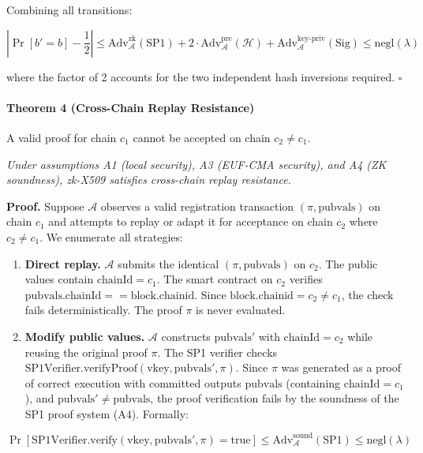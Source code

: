 \documentclass[11pt, a4paper]{article}
\begin{document}
Combining all transitions:

\[\left| \Pr[b' = b] - \frac{1}{2} \right| \leq \text{Adv}_{\mathcal{A}}^{\text{zk}}(\text{SP1}) + 2 \cdot \text{Adv}_{\mathcal{A}}^{\text{pre}}(\mathcal{H}) + \text{Adv}_{\mathcal{A}}^{\text{key-priv}}(\text{Sig}) \leq \text{negl}(\lambda)\]

where the factor of 2 accounts for the two independent hash inversions
required. \(\square\)

\paragraph{Theorem 4 (Cross-Chain Replay Resistance)}\label{theorem-4-cross-chain-replay-resistance} A valid proof for
chain \(c_1\) cannot be accepted on chain \(c_2 \neq c_1\).

\emph{Under assumptions A1 (local security), A3 (EUF-CMA security), and
A4 (ZK soundness), zk-X509 satisfies cross-chain replay resistance.}

\textbf{Proof.} Suppose \(\mathcal{A}\) observes a valid registration
transaction \((\pi, \text{pubvals})\) on chain \(c_1\) and attempts to
replay or adapt it for acceptance on chain \(c_2\) where
\(c_2 \neq c_1\). We enumerate all strategies:

\begin{enumerate}
\def\labelenumi{(\alph{enumi})}
\item
  \textbf{Direct replay.} \(\mathcal{A}\) submits the identical
  \((\pi, \text{pubvals})\) on \(c_2\). The public values contain
  \(\text{chainId} = c_1\). The smart contract on \(c_2\) verifies
  \(\text{pubvals.chainId} == \text{block.chainid}\). Since
  \(\text{block.chainid} = c_2 \neq c_1\), the check fails
  deterministically. The proof \(\pi\) is never evaluated.
\item
  \textbf{Modify public values.} \(\mathcal{A}\) constructs
  \(\text{pubvals}'\) with \(\text{chainId} = c_2\) while reusing the
  original proof \(\pi\). The SP1 verifier checks
  \(\text{SP1Verifier.verifyProof}(\text{vkey}, \text{pubvals}', \pi)\).
  Since \(\pi\) was generated as a proof of correct execution with
  committed outputs \(\text{pubvals}\) (containing
  \(\text{chainId} = c_1\)), and
  \(\text{pubvals}' \neq \text{pubvals}\), the proof verification fails
  by the soundness of the SP1 proof system (A4). Formally:
\end{enumerate}

\[\Pr[\text{SP1Verifier.verify}(\text{vkey}, \text{pubvals}', \pi) = \text{true}] \leq \text{Adv}_{\mathcal{A}}^{\text{sound}}(\text{SP1}) \leq \text{negl}(\lambda)\]
\end{document}
